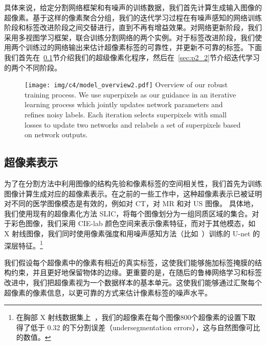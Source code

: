 具体来说，给定分割网络框架和有噪声的训练数据，我们首先计算生成输入图像的超像素。基于这样的像素聚合分组，我们的迭代学习过程在有噪声感知的网络训练阶段和标签改进阶段之间交替进行，直到不再有增益效果。对网络更新阶段，我们采用多视图学习框架，联合训练分割网络的两个实例。对于标签改进阶段，我们使用两个训练过的网络输出来估计超像素标签的可靠性，并更新不可靠的标签。下面我们首先在~\ref{sec:p2_1}节介绍我们的超级像素化程序，然后在~\ref{sec:p2_2}节介绍迭代学习的两个不同阶段。

    \begin{figure}[tbp]
        \centering 
        \texttt{[image: img/c4/model\_overview2.pdf]}
        {Overview of our robust training process. We use superpixels as our guidance in an iterative learning process which jointly updates network parameters and refines noisy labels. Each iteration selects superpixels with small losses to update two networks and relabels a set of superpixels based on network outputs.} %
        \label{fig:nss_overview}
    \end{figure}


\subsection{超像素表示} \label{sec:p2_1}

为了在分割方法中利用图像的结构先验和像素标签的空间相关性，我们首先为训练图像计算生成对应的超像素表示。在之前的一些工作中，这种超像素表示已被证明对不同的医学图像模态是有效的，例如\citet{qin2018superpixel}对 CT，\citet{tian2015superpixel}对 MR 和\citet{daoud2019automatic}对 US 图像。
具体地，我们使用现有的超像素化方法 SLIC\citep{Achanta2012SLICSC}，将每个图像划分为一组同质区域的集合。对于彩色图像，我们采用 CIE-lab 颜色空间来表示像素特征，而对于其他模态，如 X 射线图像，我们同时使用像素强度和用噪声感知方法（比如~\citet{Wei2020CombatingNL}）训练的 U-net 的深层特征。\footnote{在胸部 X 射线数据集上~\cite{Shiraishi2000DevelopmentOA,Ginneken2006SegmentationOA}，我们的超像素在每个图像800个超像素的设置下取得了低于 0.32 的下分割误差（undersegmentation errors），这与自然图像可比的数值\citep{Achanta2012SLICSC}。}

我们假设每个超像素中的像素有相近的真实标签，这使我们能够施加标签掩膜的结构约束，并且更好地保留物体的边缘。更重要的是，在随后的鲁棒网络学习和标签改进中，我们把超像素视为一个数据样本的基本单元。这使我们能够通过汇聚每个超像素的像素信息，以更可靠的方式来估计像素标签的噪声水平。

